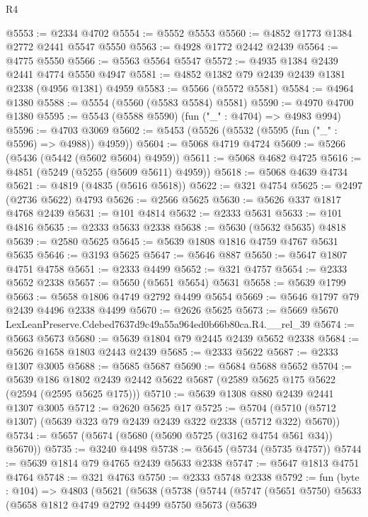 \begin{lexlean}{R4}
\begin{coremodule}
@5553 := @2334 @4702
@5554 := @5552 @5553
@5560 := @4852 @1773 @1384 @2772 @2441 @5547 @5550
@5563 := @4928 @1772 @2442 @2439
@5564 := @4775 @5550
@5566 := @5563 @5564 @5547
@5572 := @4935 @1384 @2439 @2441 @4774 @5550 @4947
@5581 := @4852 @1382 @79 @2439 @2439 @1381 @2338 (@4956 @1381) @4959
@5583 := @5566 (@5572 @5581)
@5584 := @4964 @1380
@5588 := @5554 (@5560 (@5583 @5584) @5581)
@5590 := @4970 @4700 @1380
@5595 := @5543 (@5588 @5590) (fun ("_" : @4704) => @4983 @994)
@5596 := @4703 @3069
@5602 := @5453 (@5526 (@5532 (@5595 (fun ("_" : @5596) => @4988)) @4959))
@5604 := @5068 @4719 @4724
@5609 := @5266 (@5436 (@5442 (@5602 @5604) @4959))
@5611 := @5068 @4682 @4725
@5616 := @4851 (@5249 (@5255 (@5609 @5611) @4959))
@5618 := @5068 @4639 @4734
@5621 := @4819 (@4835 (@5616 @5618))
@5622 := @321 @4754
@5625 := @2497 (@2736 @5622) @4793
@5626 := @2566 @5625
@5630 := @5626 @337 @1817 @4768 @2439
@5631 := @101 @4814
@5632 := @2333 @5631
@5633 := @101 @4816
@5635 := @2333 @5633 @2338
@5638 := @5630 (@5632 @5635) @4818
@5639 := @2580 @5625
@5645 := @5639 @1808 @1816 @4759 @4767 @5631 @5635
@5646 := @3193 @5625
@5647 := @5646 @887
@5650 := @5647 @1807 @4751 @4758
@5651 := @2333 @4499
@5652 := @321 @4757
@5654 := @2333 @5652 @2338
@5657 := @5650 (@5651 @5654) @5631
@5658 := @5639 @1799
@5663 := @5658 @1806 @4749 @2792 @4499 @5654
@5669 := @5646 @1797 @79 @2439 @4496 @2338 @4499
@5670 := @2626 @5625
@5673 := @5669 @5670 LexLeanPreserve.Cdebed7637d9c49a55a964ed0b66b80ca.R4.__rel_39
@5674 := @5663 @5673
@5680 := @5639 @1804 @79 @2445 @2439 @5652 @2338
@5684 := @5626 @1658 @1803 @2443 @2439
@5685 := @2333 @5622
@5687 := @2333 @1307 @3005
@5688 := @5685 @5687
@5690 := @5684 @5688 @5652
@5704 := @5639
    @186
    @1802
    @2439
    @2442
    @5622
    @5687
    (@2589 @5625 @175 @5622 (@2594 (@2595 @5625 @175)))
@5710 := @5639 @1308 @880 @2439 @2441 @1307 @3005
@5712 := @2620 @5625 @17
@5725 := @5704 (@5710 (@5712 @1307) (@5639 @323 @79 @2439 @2439 @322 @2338 (@5712 @322) @5670))
@5734 := @5657 (@5674 (@5680 (@5690 @5725 (@3162 @4754 @561 @34)) @5670))
@5735 := @3240 @4498
@5738 := @5645 (@5734 (@5735 @4757))
@5744 := @5639 @1814 @79 @4765 @2439 @5633 @2338
@5747 := @5647 @1813 @4751 @4764
@5748 := @321 @4763
@5750 := @2333 @5748 @2338
@5792 := fun (byte : @104) =>
  @4803
    (@5621
      (@5638
        (@5738
          (@5744
            (@5747
              (@5651 @5750)
              @5633
              (@5658
                @1812
                @4749
                @2792
                @4499
                @5750
                @5673
                (@5639

\end{coremodule}
\end{lexlean}
